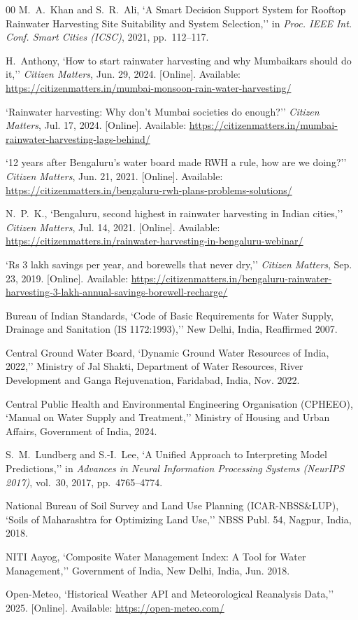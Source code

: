 ﻿\documentclass[conference]{IEEEtran}
\begin{document}
\begin{thebibliography}{00}
M.~A.~Khan and S.~R.~Ali, `A Smart Decision Support System for Rooftop Rainwater Harvesting Site Suitability and System Selection,'' in \textit{Proc. IEEE Int. Conf. Smart Cities (ICSC)}, 2021, pp.~112--117.

H.~Anthony, `How to start rainwater harvesting and why Mumbaikars should do it,'' \textit{Citizen Matters}, Jun. 29, 2024. [Online]. Available: \url{https://citizenmatters.in/mumbai-monsoon-rain-water-harvesting/}

`Rainwater harvesting: Why don't Mumbai societies do enough?'' \textit{Citizen Matters}, Jul. 17, 2024. [Online]. Available: \url{https://citizenmatters.in/mumbai-rainwater-harvesting-lags-behind/}

`12 years after Bengaluru's water board made RWH a rule, how are we doing?'' \textit{Citizen Matters}, Jun. 21, 2021. [Online]. Available: \url{https://citizenmatters.in/bengaluru-rwh-plans-problems-solutions/}

N.~P.~K., `Bengaluru, second highest in rainwater harvesting in Indian cities,'' \textit{Citizen Matters}, Jul. 14, 2021. [Online]. Available: \url{https://citizenmatters.in/rainwater-harvesting-in-bengaluru-webinar/}

`Rs 3 lakh savings per year, and borewells that never dry,'' \textit{Citizen Matters}, Sep. 23, 2019. [Online]. Available: \url{https://citizenmatters.in/bengaluru-rainwater-harvesting-3-lakh-annual-savings-borewell-recharge/}

Bureau of Indian Standards, `Code of Basic Requirements for Water Supply, Drainage and Sanitation (IS 1172:1993),'' New Delhi, India, Reaffirmed 2007.

Central Ground Water Board, `Dynamic Ground Water Resources of India, 2022,'' Ministry of Jal Shakti, Department of Water Resources, River Development and Ganga Rejuvenation, Faridabad, India, Nov. 2022.

Central Public Health and Environmental Engineering Organisation (CPHEEO), `Manual on Water Supply and Treatment,'' Ministry of Housing and Urban Affairs, Government of India, 2024.

S.~M.~Lundberg and S.-I.~Lee, `A Unified Approach to Interpreting Model Predictions,'' in \textit{Advances in Neural Information Processing Systems (NeurIPS 2017)}, vol.~30, 2017, pp.~4765--4774.

National Bureau of Soil Survey and Land Use Planning (ICAR-NBSS\&LUP), `Soils of Maharashtra for Optimizing Land Use,'' NBSS Publ. 54, Nagpur, India, 2018.

NITI Aayog, `Composite Water Management Index: A Tool for Water Management,'' Government of India, New Delhi, India, Jun. 2018.

Open-Meteo, `Historical Weather API and Meteorological Reanalysis Data,'' 2025. [Online]. Available: \url{https://open-meteo.com/}

\end{thebibliography}
\end{document}
